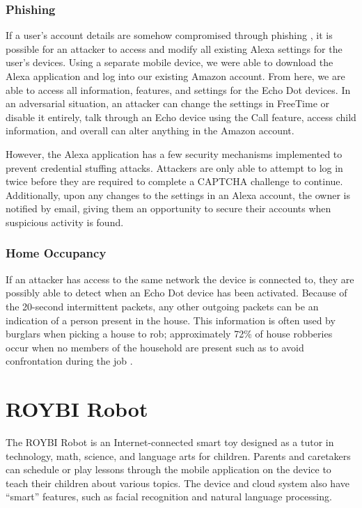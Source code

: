 \documentclass[12pt]{ucthesis}
\begin{document}
\subsubsection{Phishing}
If a user's account details are somehow compromised through phishing \cite{phishing}, it is possible for an attacker to access and modify all existing Alexa settings for the user's devices. Using a separate mobile device, we were able to download the Alexa application and log into our existing Amazon account. From here, we are able to access all information, features, and settings for the Echo Dot devices. In an adversarial situation, an attacker can change the settings in FreeTime or disable it entirely, talk through an Echo device using the Call feature, access child information, and overall can alter anything in the Amazon account.  

However, the Alexa application has a few security mechanisms implemented to prevent credential stuffing attacks. Attackers are only able to attempt to log in twice before they are required to complete a CAPTCHA \cite{captcha} challenge to continue. Additionally, upon any changes to the settings in an Alexa account, the owner is notified by email, giving them an opportunity to secure their accounts when suspicious activity is found.

\subsubsection{Home Occupancy}
If an attacker has access to the same network the device is connected to, they are possibly able to detect when an Echo Dot device has been activated. Because of the 20-second intermittent packets, any other outgoing packets can be an indication of a person present in the house. This information is often used by burglars when picking a house to rob; approximately 72\% of house robberies occur when no members of the household are present such as to avoid confrontation during the job \cite{burglar}. 

\section{ROYBI Robot}
The ROYBI Robot is an Internet-connected smart toy designed as a tutor in technology, math, science, and language arts for children. Parents and caretakers can schedule or play lessons through the mobile application on the device to teach their children about various topics. The device and cloud system also have ``smart'' features, such as facial recognition and natural language processing.
\end{document}
